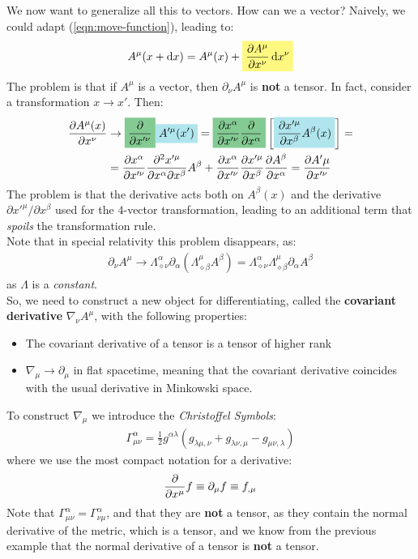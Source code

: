 \documentclass[../template.tex]{subfiles}
\begin{document}
We now want to generalize all this to vectors. How can we  a vector? Naively, we could adapt (\ref{eqn:move-function}), leading to:
\begin{align*}
    A^\mu(x+\dd{x}) = A^\mu(x) +  \hlc{Yellow}{\pdv{A^\mu}{x^\nu} \dd{x^\nu}}
\end{align*}
The problem is that if $A^\mu$ is a vector, then $\partial_\nu A^\mu$ is \textbf{not} a tensor. In fact, consider a transformation $x \to x'$. Then:
\begin{align*}
    \pdv{A^\mu (x)}{x^\nu} &\to \hlc{ForestGreen}{\pdv{x'^\nu}} \hlc{SkyBlue}{A'^\mu(x')} = \hlc{ForestGreen}{\pdv{x^\alpha}{x'^\nu} \pdv{x^\alpha}}\left[\hlc{SkyBlue}{\pdv{x'^\mu}{x^\beta} A^\beta (x)}\right] =\\
    &= \pdv{x^\alpha}{x'^\nu} \pdv{x'^\mu}{x^\alpha}{x^\beta} A^\beta + \pdv{x^\alpha}{x'^\nu} \pdv{x'^\mu}{x^\beta} \pdv{A^\beta}{x^\alpha} = \pdv{A'{\mu}}{x'^\nu}
\end{align*}   
The problem is that the derivative acts both on $A^\beta(x)$ and the derivative $\partial x'^\mu / \partial x^\beta$ used for the $4$-vector transformation, leading to an additional term that \textit{spoils} the transformation rule.\\
Note that in special relativity this problem disappears, as:
\begin{align*}
    \partial_\nu A^\mu \to \Lambda^\alpha_{\diamond \nu} \partial_\alpha (\Lambda^\mu_{\diamond \beta} A^\beta) = \Lambda^\alpha_{\diamond \nu} \Lambda^\mu_{\diamond \beta}\partial_\alpha A^\beta
\end{align*}    
as $\Lambda$ is a \textit{constant}.\\

So, we need to construct a new object for differentiating, called the \textbf{covariant derivative} $\nabla_\nu A^\mu$, with the following properties:
\begin{itemize}
    \item The covariant derivative of a tensor is a tensor of higher rank
    \item $\nabla_\mu \to \partial_\mu$ in flat spacetime, meaning that the covariant derivative coincides with the usual derivative in Minkowski space. 
\end{itemize}
To construct $\nabla_\mu$ we introduce the \textit{Christoffel Symbols}:
\begin{align*}
    \Gamma^\alpha_{\mu \nu} = \frac{1}{2} g^{\alpha \lambda} (g_{\lambda \mu, \nu} + g_{\lambda \nu, \mu} - g_{\mu \nu, \lambda}) 
\end{align*}
where we use the most compact notation for a derivative:
\begin{align*}
    \pdv{x^\mu} f \equiv \partial_\mu f \equiv f_{,\mu}
\end{align*}
Note that $\Gamma^\alpha_{\mu \nu} = \Gamma^\alpha_{\nu \mu}$, and that they are \textbf{not} a tensor, as they contain the normal derivative of the metric, which is a tensor, and we know from the previous example that the normal derivative of a tensor is \textbf{not} a tensor.\\
\end{document}
